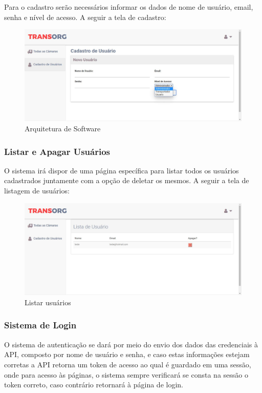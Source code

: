 	Para o cadastro serão necessários informar os dados de nome de usuário, email, senha e nível de acesso. A seguir a tela de cadastro:

\begin{figure}[H]
\centering
\includegraphics[width=16cm]{figuras/cadastro_software.JPG}
\caption{Arquitetura de Software}
\end{figure}

\subsubsection{Listar e Apagar Usuários}
	O sistema irá dispor de uma página específica para listar todos os usuários cadastrados juntamente com a opção de deletar os mesmos. A seguir a tela de listagem de usuários:

\begin{figure}[H]
\centering
\includegraphics[width=16cm]{figuras/listaUsuarios_software.JPG}
\caption{Listar usuários}
\end{figure}

\subsubsection{Sistema de Login}
	O sistema de autenticação se dará por meio do envio dos dados das credenciais à API, composto por nome de usuário e senha, e caso estas informações estejam corretas a API retorna um token de acesso ao qual é guardado em uma sessão, onde para acesso às páginas, o sistema sempre verificará se consta na sessão o token correto, caso contrário retornará à página de login. 
	
